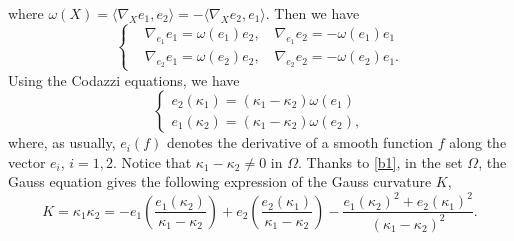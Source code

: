 \documentclass{birkjour}
\theoremstyle{definition}
\theoremstyle{remark}
\numberwithin{equation}{section}
\begin{document}
where $\omega(X)=\langle\nabla_X e_1,e_2\rangle=-\langle\nabla_X e_2,e_1\rangle$. Then we have 
\begin{equation}\label{eiej}
\left\{
\begin{split}
&\nabla_{e_1}e_1=\omega(e_1)e_2,\quad \nabla_{e_1}e_2=-\omega(e_1)e_1\\
&\nabla_{e_2}e_1=\omega(e_2)e_2,\quad \nabla_{e_2}e_2=-\omega(e_2)e_1.
\end{split}\right.
\end{equation}
Using the Codazzi equations, we have  
\begin{equation}\label{b1}
    \left\{
    \begin{array}{ll}
        e_{2}(\kappa_1)=(\kappa_1-\kappa_2)\omega(e_1)\\
        e_{1}(\kappa_2)=(\kappa_1-\kappa_2)\omega(e_2),
    \end{array}
    \right.
\end{equation}
where, as usually, $e_i(f)$ denotes the derivative of a smooth function $f$ along the vector $e_i$, $i=1,2$.  Notice that $\kappa_1-\kappa_2\not=0$ in $\Omega$.
Thanks to  \eqref{b1}, in the set $\Omega$, the  Gauss equation  gives the following expression of the Gauss curvature $K$,  
\begin{equation}\label{bb}
   K=\kappa_1\kappa_2=-e_1\left(\frac{e_1( \kappa_2 )}{\kappa_1-\kappa_2} \right)+e_2\left(\frac{e_2( \kappa_1 )}{\kappa_1 -\kappa_2}\right)
   -\frac{e_1( \kappa_2)^2+ e_2( \kappa_1 )^2}{(\kappa_1 -\kappa_2)^2}.
\end{equation}
 
 
\end{document}
